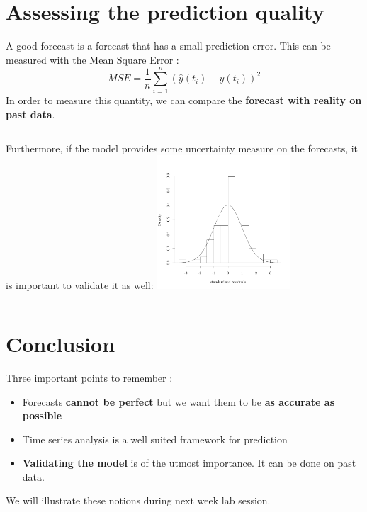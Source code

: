 \documentclass{beamer}
\begin{document}
\section[Model validation]{Assessing the prediction quality}

\begin{frame}{}
A good forecast is a forecast that has a small prediction error. This can be measured with the Mean Square Error :
$$ MSE = \frac1n\sum_{i=1}^n (\hat{y}(t_i) - y(t_i))^2$$
In order to measure this quantity, we can compare the \textbf{forecast with reality on past data}. \\
\vspace{5mm}
\begin{columns}[c]
\column{5cm}
Furthermore, if the model provides some uncertainty measure on the forecasts, it is important to validate it as well:
\column{5cm}
\includegraphics[height=5cm]{figures/VALID_hist.pdf}
\end{columns}
\end{frame}

\section{Conclusion}

\begin{frame}{}
Three important points to remember :\\
\vspace{2mm}
\begin{itemize}
	\item Forecasts \textbf{cannot be perfect} but we want them to be \textbf{as accurate as possible} \vspace{2mm}
	\item Time series analysis is a well suited framework for prediction \vspace{2mm}
	\item \textbf{Validating the model} is of the utmost importance. It can be done on past data.
\end{itemize}
\vspace{8mm}
We will illustrate these notions during next week lab session.
\end{frame}
\end{document}
